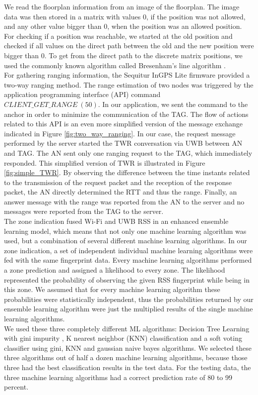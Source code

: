 \noindent\hspace*{5mm}%
We read the floorplan information from an image of the floorplan. The image data was then stored in a matrix with values 0, if the position was not allowed, and any other value bigger than 0, when the position was an allowed position. For checking if a position was reachable, we started at the old position and checked if all values on the direct path between the old and the new position were bigger than 0. To get from the direct path to the discrete matrix positions, we used the commonly known algorithm called Bresenham's line algorithm \cite{bresenham}.\\
\noindent\hspace*{5mm}%
For gathering ranging information, the Sequitur InGPS Lite firmware provided a two-way ranging method. The range estimation of two nodes was triggered by the application programming interface (API) command $CLIENT\_GET\_RANGE\ (50)$. In our application, we sent the command to the anchor in order to minimize the communication of the TAG. The flow of actions related to this API is an even more simplified version of the message exchange indicated in Figure \ref{fig:two_way_ranging}. In our case, the request message performed by the server started the TWR conversation via UWB between AN and TAG. The AN sent only one ranging request to the TAG, which immediately responded. This simplified version of TWR is illustrated in Figure \ref{fig:simple_TWR}. By observing the difference between the time instants related to the transmission of the request packet and the reception of the response packet, the AN directly determined the RTT and thus the range.  Finally, an answer message with the range was reported from the AN to the server and no messages were reported from the TAG to the server.\\
\noindent\hspace*{5mm}%
The zone indication fused Wi-Fi and UWB RSS in an enhanced ensemble learning model, which means that not only one machine learning algorithm was used, but a combination of several different machine learning algorithms. In our zone indication, a set of independent individual machine learning algorithms were fed with the same fingerprint data. Every machine learning algorithms performed a zone prediction and assigned a likelihood to every zone. The likelihood represented the probability of observing the given RSS fingerprint while being in this zone. We assumed that for every machine learning algorithm these probabilities were statistically independent, thus the probabilities returned by our ensemble learning algorithm were just the multiplied results of the single machine learning algorithms.\\
We used these three completely different ML algorithms: Decision Tree Learning with gini impurity \cite{WikiGini}, K nearest neighbor (KNN) classification \cite{KNN} and a soft voting classifier using gini, KNN and gaussian naive bayes \cite{SKLearn, GaussianNB} algorithms. We selected these three algorithms out of half a dozen machine learning algorithms, because those three had the best classification results in the test data. For the testing data, the three machine learning algorithms had a correct prediction rate of 80 to 99 percent. 

